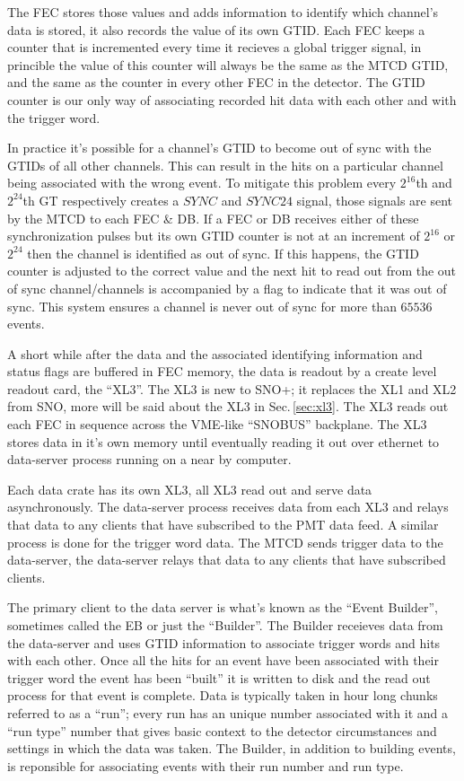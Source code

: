 The FEC stores those values and adds information to identify which
channel's data is stored, it also records the value of its own GTID\@.
Each FEC keeps a counter that is incremented every time it recieves a global
trigger signal, in princible the value of this counter will always be the same
as the MTCD GTID, and the same as the counter in every other FEC in the detector.
The GTID counter is our only way of associating recorded hit data with each other
and with the trigger word.

In practice it's possible for a channel's GTID to become out of sync with the GTIDs of
all other channels.
This can result in the hits on a particular channel being associated with
the wrong event.
To mitigate this problem every $2^{16}$th and $2^{24}$th GT respectively creates a $SYNC$ and
$SYNC24$ signal, those signals are sent by the MTCD to each FEC \& DB\@.
If a FEC or DB receives either of these synchronization pulses but its own GTID counter is not
at an increment of $2^{16}$ or $2^{24}$ then the channel is identified as out of sync.
If this happens, the GTID counter is adjusted to the correct value and the next hit to read out from the out of sync channel/channels is accompanied
by a flag to indicate that it was out of sync.
This system ensures a channel is never out of sync for more than $65536$ events.

A short while after the data and the associated identifying information and status flags are buffered
in FEC memory, the data is readout by a create level readout card,
the ``XL3''.
The XL3 is new to SNO+; it replaces the XL1 and XL2 from SNO, more will be said about the
XL3 in Sec.\,\ref{sec:xl3}.
The XL3 reads out each FEC in sequence across the VME-like ``SNOBUS'' backplane.
The XL3 stores data in it's own memory until eventually reading it out over
ethernet to data-server process running on a near by computer.

Each data crate has its own XL3, all XL3 read out and serve data asynchronously.
The data-server process receives data from each XL3 and relays that data to
any clients that have subscribed to the PMT data feed.
A similar process is done for the trigger word data. The MTCD sends trigger data
to the data-server, the data-server relays that data to any clients that have subscribed
clients.

The primary client to the data server is what's known as the ``Event Builder'', sometimes
called the EB or just the ``Builder''. The Builder receieves data from the data-server and
uses GTID information to associate trigger words and hits with each other.
Once all the hits for an event have been associated with their trigger word the event
has been ``built'' it is written to disk and the read out process for that event is complete.
Data is typically taken in hour long chunks referred to as a ``run'';
every run has an unique number associated with it and a ``run type'' number that
gives basic context to the detector circumstances and settings in which the data was taken.
The Builder, in addition to building events, is reponsible for associating
events with their run number and run type.

